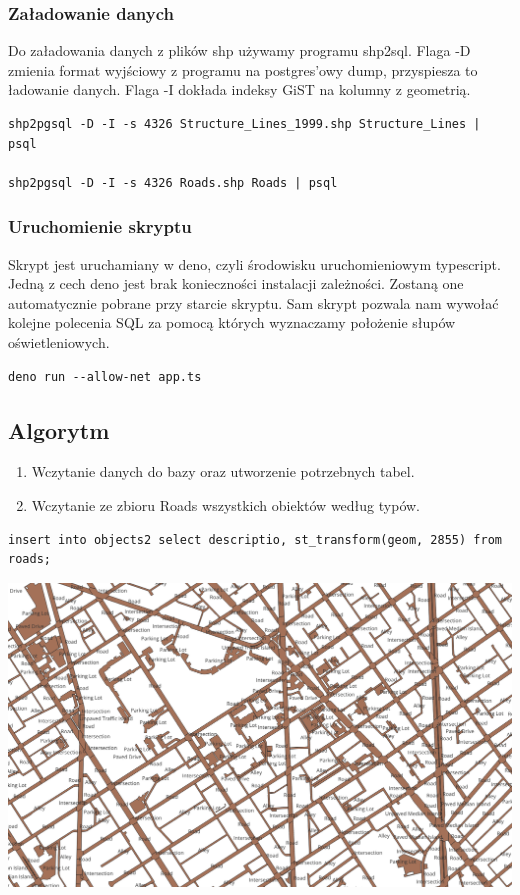 \documentclass[11pt]{article}
\begin{document}
\subsubsection{Załadowanie danych}
\label{sec:org83c46a9}

Do załadowania danych z plików shp używamy programu shp2sql. Flaga -D zmienia format wyjściowy z programu na postgres'owy dump, przyspiesza to ładowanie danych. Flaga -I dokłada indeksy GiST na kolumny z geometrią.

\begin{verbatim}
shp2pgsql -D -I -s 4326 Structure_Lines_1999.shp Structure_Lines | psql 

shp2pgsql -D -I -s 4326 Roads.shp Roads | psql 
\end{verbatim}

\subsubsection{Uruchomienie skryptu}
\label{sec:orgec4543b}

Skrypt jest uruchamiany w deno, czyli środowisku uruchomieniowym typescript. Jedną z cech deno jest brak konieczności instalacji zależności. Zostaną one automatycznie pobrane przy starcie skryptu. Sam skrypt pozwala nam wywołać kolejne polecenia SQL za pomocą których wyznaczamy położenie słupów oświetleniowych.

\begin{verbatim}
deno run --allow-net app.ts 
\end{verbatim}

\subsection{Algorytm}
\label{sec:orgb4fed20}

\begin{enumerate}
\item Wczytanie danych do bazy oraz utworzenie potrzebnych tabel.
\item Wczytanie ze zbioru Roads wszystkich obiektów według typów.
\end{enumerate}

\begin{verbatim}
insert into objects2 select descriptio, st_transform(geom, 2855) from roads;
\end{verbatim}

\begin{center}
\includegraphics[width=.9\linewidth]{./img/1.png}
\end{center}
\end{document}
